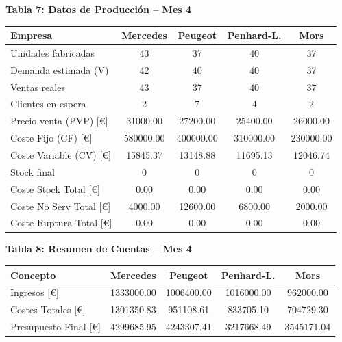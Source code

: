 \documentclass{standalone}
\begin{document}
	\leavevmode
	
	\begin{minipage}{1.08\linewidth}
		\centering
		
		\textbf{Tabla 7: Datos de Producción – Mes 4}\\[0.5em]
		\begin{tabular}{@{}l
				S[table-format=2.0]
				S[table-format=2.0]
				S[table-format=2.0]
				S[table-format=2.0]@{}}
			\toprule
			\textbf{Empresa} & \textbf{Mercedes} & \textbf{Peugeot} & \textbf{Penhard-L.} & \textbf{Mors} \\
			\midrule
			Unidades fabricadas         & 43        & 37        & 40        & 37        \\
			Demanda estimada (V)        & 42        & 40        & 40        & 37        \\
			Ventas reales               & 43        & 37        & 40        & 37        \\
			Clientes en espera          & 2         & 7         & 4         & 2         \\
			Precio venta (PVP) [\euro]  & 31000.00  & 27200.00  & 25400.00  & 26000.00  \\
			Coste Fijo (CF) [\euro]     & 580000.00 & 400000.00 & 310000.00 & 230000.00 \\
			Coste Variable (CV) [\euro] & 15845.37  & 13148.88  & 11695.13  & 12046.74  \\
			Stock final                 & 0         & 0         & 0         & 0         \\
			Coste Stock Total [\euro]   & 0.00      & 0.00      & 0.00      & 0.00      \\
			Coste No Serv Total [\euro] & 4000.00   & 12600.00  & 6800.00   & 2000.00   \\
			Coste Ruptura Total [\euro] & 0.00      & 0.00      & 0.00      & 0.00      \\
			\bottomrule
		\end{tabular}
		
		\vspace{2em}
		
		\textbf{Tabla 8: Resumen de Cuentas – Mes 4}\\[0.5em]
		\begin{tabular}{@{}l
				S[table-format=7.2]
				S[table-format=7.2]
				S[table-format=7.2]
				S[table-format=7.2]@{}}
			\toprule
			\textbf{Concepto} & \textbf{Mercedes} & \textbf{Peugeot} & \textbf{Penhard-L.} & \textbf{Mors} \\
			\midrule
			Ingresos [\euro]              & 1333000.00 & 1006400.00 & 1016000.00 & 962000.00 \\
			Costes Totales [\euro]        & 1301350.83 & 951108.61  & 833705.10  & 704729.30 \\
			Presupuesto Final [\euro]     & 4299685.95 & 4243307.41 & 3217668.49 & 3545171.04 \\
			\bottomrule
		\end{tabular}
		
	\end{minipage}
\end{document}

